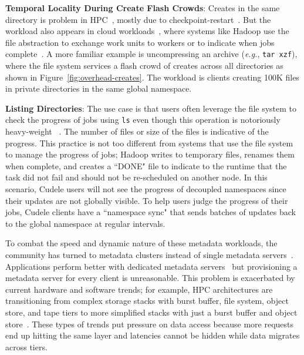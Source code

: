 \textbf{Temporal Locality During Create Flash Crowds}: Creates in the same
directory is problem in HPC~\cite{weil:sc2004-dyn-metadata, ren:sc2014-indexfs,
patil:fast2011-giga, zheng:pdsw2014-batchfs, sevilla:sc15-mantle}, mostly due
to checkpoint-restart~\cite{bent_plfs_2009}.  But the workload also appears in
cloud workloads~\cite{xiao:socc15-shardfs}, where systems like Hadoop use the
file abstraction to exchange work units to workers or to indicate when jobs
complete~\cite{shvachko:login2012-hdfs-scalability}. A more familiar example is
uncompressing an archive ({\it e.g.}, \texttt{tar xzf}), where the file system
services a flash crowd of creates across all directories as shown in
Figure~\ref{fig:overhead-creates}.  The workload is clients creating 100K files
in private directories in the same global namespace.


\textbf{Listing Directories}:
The use case is that users often leverage the file system to check the progress
of jobs using \texttt{ls} even though this operation is notoriously
heavy-weight~\cite{carns:ipdps09-pvfs, eshel:fast10-panache} . The number of
files or size of the files is indicative of the progress. This practice is not
too different from systems that use the file system to manage the progress of
jobs; Hadoop writes to temporary files, renames them when complete, and creates
a ``DONE" file to indicate to the runtime that the task did not fail and should
not be re-scheduled on another node. In this scenario, Cudele users will not
see the progress of decoupled namespaces since their updates are not globally
visible.  To help users judge the progress of their jobs, Cudele clients have a
``namespace sync" that sends batches of updates back to the global namespace at
regular intervals.

To combat the speed and dynamic nature of these metadata workloads, the
community has turned to metadata clusters instead of single metadata
servers~\cite{patil:fast2011-giga+,weil:osdi2006-ceph,weil:sc2004-dyn-metadata,
sinnamohideen:atc2010-ursa, xing:sc2009-skyfs}.  Applications perform better
with dedicated metadata servers~\cite{sevilla:sc15-mantle, ren:sc2014-indexfs}
but provisioning a metadata server for every client is unreasonable. This
problem is exacerbated by current hardware and software trends; for example,
HPC architectures are transitioning from complex storage stacks with burst
buffer, file system, object store, and tape tiers to more simplified stacks
with just a burst buffer and object store~\cite{bent:login16-hpc-trends}. These
types of trends put pressure on data access because more requests end up
hitting the same layer and latencies cannot be hidden while data migrates
across tiers.

